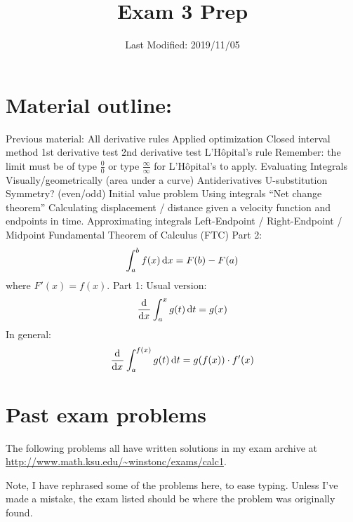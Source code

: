 \documentclass[10pt]{scrartcl}
\title{Exam 3 Prep}
\date{Last Modified: 2019/11/05}
\author{}
\begin{document}
\maketitle
\tableofcontents


\section{Material outline:}
\begin{outline}
  \1 Previous material:
  \2 All derivative rules
  \1 Applied optimization 
  \2 Closed interval method
  \2 1st derivative test
  \2 2nd derivative test
  \1 L'H\^{o}pital's rule 
  \2 Remember: the limit must be of type $\frac 00$ or type $\frac \infty \infty$ for L'H\^{o}pital's to apply.
  \1 Evaluating Integrals
  \2 Visually/geometrically (area under a curve)
  \2 Antiderivatives
  \2 U-substitution
  \2 Symmetry? (even/odd)
  \2 Initial value problem
  \1 Using integrals
  \2 ``Net change theorem''
  \2 Calculating displacement / distance given a velocity function and endpoints in time.
  \1 Approximating integrals
  \2 Left-Endpoint / Right-Endpoint / Midpoint
  \1 Fundamental Theorem of Calculus (FTC)
  \2 Part 2:
  \[
    \int_a^b f(x) \dif x = F(b) - F(a)
  \]
  where $F'(x) = f(x)$.
  \2 Part 1:
  \3 Usual version:
  \[
    \dod{}{x} \int_a^{x} g(t) \dif t = g(x)
  \]
  \3 In general:
  \[
    \dod{}{x} \int_a^{f(x)} g(t) \dif t = g(f(x)) \cdot f'(x)
  \]
\end{outline}

\section{Past exam problems}
The following problems all have written solutions in my exam archive at \url{http://www.math.ksu.edu/\~winstonc/exams/calc1}.

Note, I have rephrased some of the problems here, to ease typing. 
Unless I've made a mistake, the exam listed should be where the problem was originally found.
\end{document}
